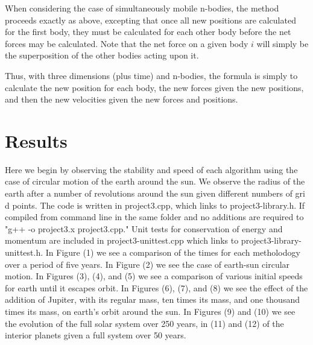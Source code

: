 \documentclass[11pt,a4paper]{article}
\begin{document}
When considering the case of simultaneously mobile n-bodies, the method proceeds exactly as above, excepting that once all new positions are calculated for the first body, they must be calculated for each other body before the net forces may be calculated. Note that the net force on a given body $i$ will simply be the superposition of the other bodies acting upon it.

Thus, with three dimensions (plus time) and n-bodies, the formula is simply to calculate the new position for each body, the new forces given the new positions, and then the new velocities given the new forces and positions. 

\section{Results}

Here we begin by observing the stability and speed of each algorithm using the case of circular motion of the earth around the sun. We observe the radius of the earth after a number of revolutions around the sun given different numbers of gri	d points. The code is written in project3.cpp, which links to project3-library.h. If compiled from command line in the same folder and no additions are required to "g++ -o project3.x project3.cpp." Unit tests for conservation of energy and momentum are included in project3-unittest.cpp which links to project3-library-unittest.h. In Figure (1) we see a comparison of the times for each metholodogy over a period of five years. In Figure (2) we see the case of earth-sun circular motion. In Figures (3), (4), and (5) we see a comparison of various initial speeds for earth until it escapes orbit. In Figures (6), (7), and (8) we see the effect of the addition of Jupiter, with its regular mass, ten times its mass, and one thousand times its mass, on earth's orbit around the sun. In Figures (9) and (10) we see the evolution of the full solar system over 250 years, in (11) and (12) of the interior planets given a full system over 50 years. 
\end{document}
